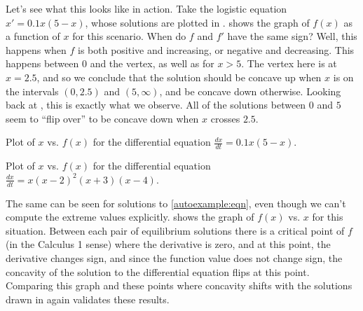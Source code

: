 \documentclass{ximera}
\begin{document}
Let's see what this looks like in action. Take the logistic equation $x' = 0.1x(5-x)$, whose solutions are plotted in .  shows the graph of $f(x)$ as a function of $x$ for this scenario. When do $f$ and $f'$ have the same sign? Well, this happens when $f$ is both positive and increasing, or negative and decreasing. This happens between $0$ and the vertex, as well as for $x> 5$. The vertex here is at $x=2.5$, and so we conclude that the solution should be concave up when $x$ is on the intervals $(0, 2.5)$ and $(5, \infty)$, and be concave down otherwise. Looking back at , this is exactly what we observe. All of the solutions between $0$ and $5$ seem to ``flip over'' to be concave down when $x$ crosses $2.5$.   


\begin{myfig}
\parbox[t]{3.0in}{
 \capstart
 \caption{Plot of $x$ vs. $f(x)$ for the differential equation $\frac{dx}{dt} = 0.1x(5-x)$.\label{autologfplot:fig}}
}
\quad
\parbox[t]{3.0in}{
 \capstart
 \caption{{Plot of $x$ vs. $f(x)$ for the differential equation $\frac{dx}{dt} = x(x-2)^2(x+3)(x-4)$.\label{autoexfplot:fig}}
} }
\end{myfig}

The same can be seen for solutions to \eqref{autoexample:eqn}, even though we can't compute the extreme values explicitly.  shows the graph of $f(x)$ vs. $x$ for this situation. Between each pair of equilibrium solutions there is a critical point of $f$ (in the Calculus 1 sense) where the derivative is zero, and at this point, the derivative changes sign, and since the function value does not change sign, the concavity of the solution to the differential equation flips at this point. Comparing this graph and these points where concavity shifts with the solutions drawn in  again validates these results.
\end{document}
